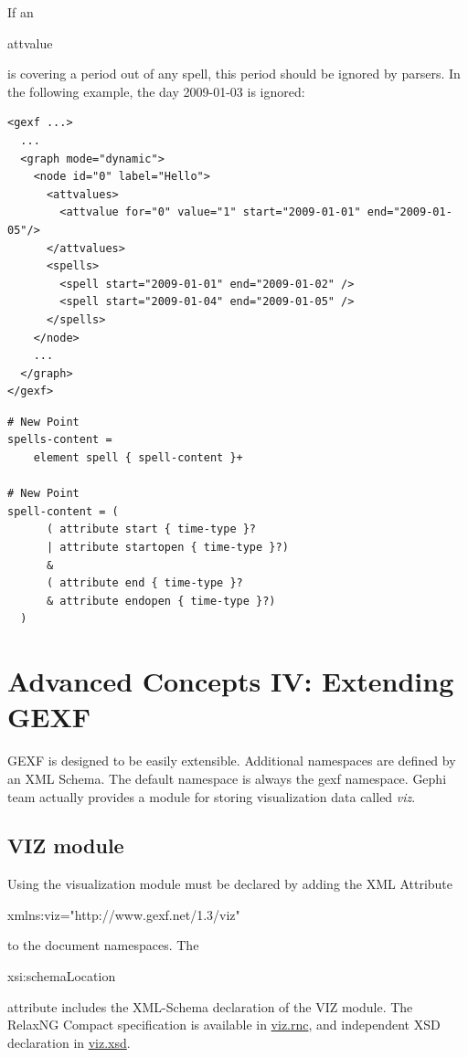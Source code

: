 \documentclass[a4paper,10pt]{article}
\begin{document}
If an \begin{footnotesize}attvalue\end{footnotesize} is covering a period out of any spell, this period should be ignored by parsers. In the following example, the day 2009-01-03 is ignored:

\lstset{ style=gexf }
\begin{lstlisting}[caption={Spells and attvalues}]
<gexf ...>
  ...
  <graph mode="dynamic">
    <node id="0" label="Hello">
      <attvalues>
        <attvalue for="0" value="1" start="2009-01-01" end="2009-01-05"/>
      </attvalues>
      <spells>
        <spell start="2009-01-01" end="2009-01-02" />
        <spell start="2009-01-04" end="2009-01-05" />
      </spells>
    </node>
    ...
  </graph>
</gexf>
\end{lstlisting}

\lstset{ style=rnc }
\begin{lstlisting}[caption={Spells Specification},label=dynspellsRNC]
# New Point
spells-content =
    element spell { spell-content }+

# New Point
spell-content = (
      ( attribute start { time-type }?
      | attribute startopen { time-type }?)
      &
      ( attribute end { time-type }?
      & attribute endopen { time-type }?)
  )
\end{lstlisting}

\section{Advanced Concepts IV: Extending GEXF} \label{extendgexf}

GEXF is designed to be easily extensible. Additional namespaces are defined by an XML Schema. The default namespace is always the gexf namespace. Gephi team actually provides a module for storing visualization data called \textit{viz}.

\subsection{VIZ module} \label{viz}

Using the visualization module must be declared by adding the XML Attribute \begin{footnotesize}xmlns:viz="http://www.gexf.net/1.3/viz"\end{footnotesize} to the document namespaces. The \begin{footnotesize}xsi:schemaLocation\end{footnotesize} attribute includes the XML-Schema declaration of the VIZ module. The RelaxNG Compact specification is available in \href{http://www.gexf.net/1.3/viz.rnc}{viz.rnc}, and independent XSD declaration in \href{http://www.gexf.net/1.3/viz.xsd}{viz.xsd}.
\end{document}
